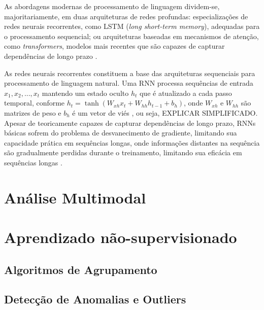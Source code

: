 As abordagens modernas de processamento de linguagem dividem-se, majoritariamente, em duas arquiteturas de redes profundas: especializações de redes neurais recorrentes, como LSTM (\textit{long short-term memory}), adequadas para o processamento sequencial; ou arquiteturas baseadas em mecanismos de atenção, como \textit{transformers}, modelos mais recentes que são capazes de capturar dependências de longo prazo \cite{nlp2}.

As redes neurais recorrentes constituem a base das arquiteturas sequenciais para processamento de linguagem natural. Uma RNN processa sequências de entrada $x_1, x_2, ..., x_{t}$ mantendo um estado oculto $h_{t}$ que é atualizado a cada passo temporal, conforme $h_{t} = \tanh(W_{xh}x_{t} + W_{hh}h_{t-1} + b_{h})$, onde $W_{xh}$ e $W_{hh}$ são matrizes de peso e $b_{h}$ é um vetor de viés \cite{lstm}, ou seja, EXPLICAR SIMPLIFICADO. Apesar de teoricamente capazes de capturar dependências de longo prazo, RNNs básicas sofrem do problema de desvanecimento de gradiente, limitando sua capacidade prática em sequências longas, onde informações distantes na sequência são gradualmente perdidas durante o treinamento, limitando sua eficácia em sequências longas \cite{nlp}.

\section{Análise Multimodal}


\section{Aprendizado não-supervisionado}





\subsection{Algoritmos de Agrupamento}


\subsection{Detecção de Anomalias e Outliers}